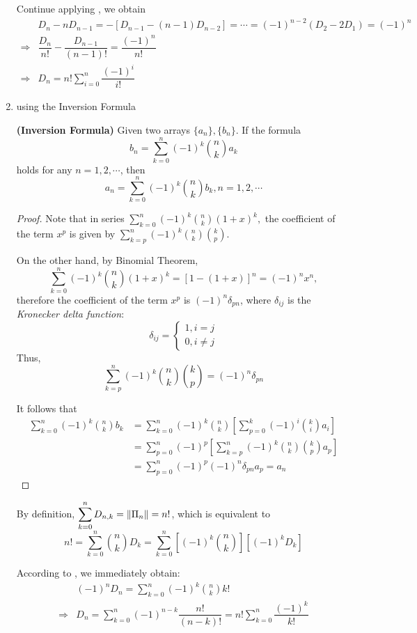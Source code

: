 \begin{enumerate}
Continue applying , we obtain
\begin{align*}
 &D_n - nD_{n-1} = -[D_{n-1}-(n-1)D_{n-2}]= \cdots  =(-1)^{n-2}(D_2 - 2D_1) = (-1)^n \\
 \Rightarrow & \dfrac{D_n}{n!} - \dfrac{D_{n-1}}{(n-1)!} = \dfrac{(-1)^n}{n!} \\
 \Rightarrow &D_n = n! \sum_{i=0}^n{\dfrac{(-1)^i}{i!}}
\end{align*}

\item using the Inversion Formula
\begin{lemma}
  \textbf{(Inversion Formula)}
  \label{lemma:inversion}
  Given two arrays $ \{ a_n\},\{ b_n\} $. If the formula
  \[  b_n = \sum_{k=0}^n(-1)^k{n\choose{k}}a_k\]
  holds for any $ n = 1,2,\cdots $, then
  \[ a_n = \sum_{k=0}^n(-1)^k{n\choose{k}}b_k, n = 1,2,\cdots \]
\end{lemma}
\begin{proof}
Note that in series $ \sum_{k=0}^n(-1)^k{n\choose{k}}(1+x)^k,$
the coefficient of the term $ x^p$ is given by $
\sum_{k=p}^n(-1)^k{n\choose{k}}{k\choose{p}}.$

On the other hand, by Binomial Theorem,
\[ \sum_{k=0}^n(-1)^k{n\choose{k}}(1+x)^k = [1-(1+x)]^n = (-1)^nx^n, \]
therefore the coefficient of the term $ x^p$ is $(-1)^n\delta_{pn} $, where $ \delta_{ij}$ is the
\emph{Kronecker delta function}:
\[ \delta_{ij} = \begin{cases}
  1, i = j \\ 0, i \ne j \end{cases} \]
  Thus,
  \[ \sum_{k=p}^n(-1)^k{n\choose{k}}{k\choose{p}} = (-1)^n\delta_{pn}\]

  It follows that
\begin{align*}
    \sum_{k=0}^n(-1)^k{n\choose{k}}b_k &=
    \sum_{k=0}^n(-1)^k{n\choose{k}}\left[\sum_{p=0}^k(-1)^i{k\choose{i}}a_i\right] \\
    &=\sum_{p=0}^n(-1)^p\left[\sum_{k=p}^n(-1)^k{n\choose{k}}{k\choose{p}}a_p\right] \\
   &=\sum_{p=0}^n(-1)^p(-1)^n\delta_{pn}a_p = a_n
\end{align*} \end{proof}

By definition, $ \sum_{k=0}^nD_{n,k} =\card{\Pi_n}= n!$,
which is equivalent to
 \begin{equation}
 n! = \sum_{k=0}^n{n\choose{k}}D_k =
  \sum_{k=0}^n\left[ (-1)^k{n\choose{k}}\right]\left[(-1)^kD_k\right]
  \label{eqn:fact}
  \end{equation}

According to , we immediately obtain:
\begin{align*}
&(-1)^nD_n = \sum_{k=0}^n(-1)^k{n\choose{k}}k! \\
\Rightarrow & D_n = \sum_{k=0}^n(-1)^{n-k}\dfrac{n!}{(n-k)!} = n!\sum_{k=0}^n\dfrac{(-1)^k}{k!}
\end{align*}
\end{enumerate}

